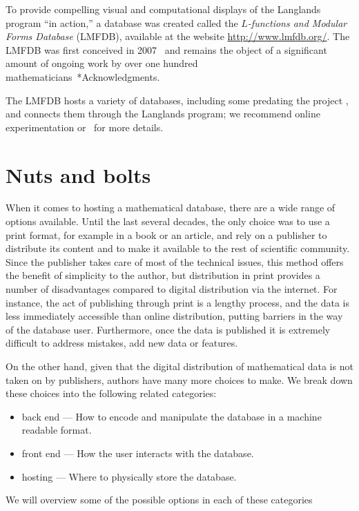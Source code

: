 \documentclass{amsart}
\begin{document}
To provide compelling visual and computational displays of the Langlands program ``in action,'' a database was created called the \emph{$L$-functions and Modular Forms Database} (LMFDB), available at the website \url{http://www.lmfdb.org/}.
The LMFDB was first conceived in 2007~\cite{cremona-16} and remains the object of a significant amount of ongoing work by over one hundred mathematicians~\cite{lmfdb}*{Acknowledgments}.

The LMFDB hosts a variety of databases, including some predating the project \cites{cremona-97, jones-roberts-06, jones-roberts-14}, and connects them through the Langlands program; we recommend online experimentation or~\cite{cremona-16} for more details.


\section{Nuts and bolts}
\label{sec:nutsbolts}


When it comes to hosting a mathematical database, there are a wide range of options available.
Until the last several decades, the only choice was to use a print format, for example in a book or an article, and rely on a publisher to distribute its content and to make it available to the rest of scientific community.
Since the publisher takes care of most of the technical issues, this method offers the benefit of simplicity to the author, but distribution in print provides a number of disadvantages compared to digital distribution via the internet.
For instance, the act of publishing through print is a lengthy process, and the data is less immediately accessible than online distribution, putting barriers in the way of the database user.
Furthermore, once the data is published it is extremely difficult to address  mistakes, add new data or features.

On the other hand, given that the digital distribution of mathematical data is not taken on by publishers, authors have many more choices to make.
We break down these choices into the following related categories:
\begin{itemize}
  \item back end --- How to encode and manipulate the database in a machine readable format.
  \item front end --- How the user interacts with the database.
  \item hosting --- Where to physically store the database.
\end{itemize}
We will overview some of the possible options in each of these categories
\end{document}
